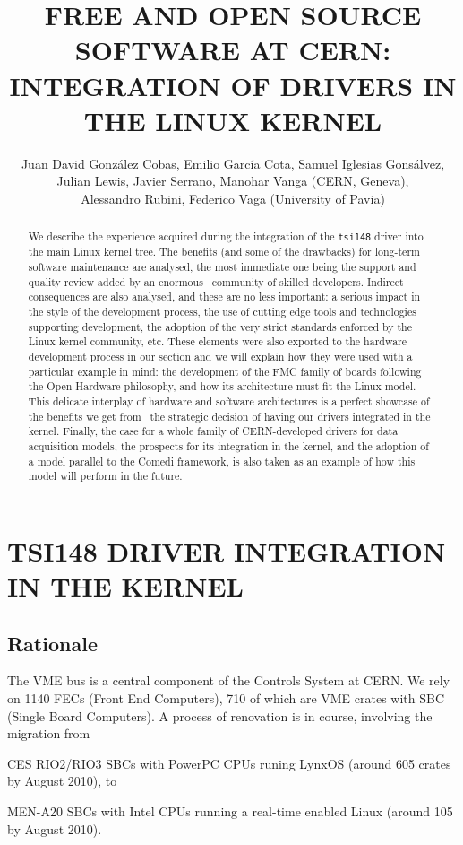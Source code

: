 \documentclass{JAC2003}
\title{%
    FREE AND OPEN SOURCE SOFTWARE AT CERN:\\
    INTEGRATION OF DRIVERS IN THE LINUX KERNEL}
\author{%
	Juan David Gonz\'alez Cobas, Emilio Garc\'ia Cota,
	Samuel Iglesias Gons\'alvez,\\
	Julian Lewis, Javier Serrano, Manohar Vanga (CERN, Geneva),\\ 
	Alessandro Rubini, Federico Vaga (University of Pavia)}
\begin{document}
\maketitle
\begin{abstract}
    We describe the experience acquired during the integration of the
    \texttt{tsi148} driver
    into the main Linux kernel tree. The benefits (and some of the drawbacks) for
    long-term software maintenance are analysed, the most immediate one being the
    support and quality review added by an enormous  community of skilled
    developers. Indirect consequences are also analysed, and these are no less
    important: a serious impact in the style of the development process, the use of
    cutting edge tools and technologies supporting development, the adoption of the
    very strict standards enforced by the Linux kernel community, etc. These
    elements were also exported to the hardware development process in our section
    and we will explain how they were used with a particular example in mind: the
    development of the FMC family of boards following the Open Hardware philosophy,
    and how its architecture must fit the Linux model. This delicate interplay of
    hardware and software architectures is a perfect showcase of the benefits we
    get from  the strategic decision of having our drivers integrated in the
    kernel.  Finally, the case for a whole family of CERN-developed drivers for
    data acquisition models, the prospects for its integration in the kernel, and
    the adoption of a model parallel to the Comedi framework, is also
    taken as an example of how this model will perform in the future.
\end{abstract}


\section{TSI148 DRIVER INTEGRATION IN THE KERNEL}
\subsection{Rationale}
The VME bus is a central component of the Controls System at CERN. We
rely on 1140 FECs (Front End Computers), 710 of which are VME crates
with SBC (Single Board Computers). A process of renovation is in course,
involving the migration from
\begin{Itemize}
\item CES RIO2/RIO3 SBCs with PowerPC CPUs runing LynxOS (around 605
    crates by August 2010), to
\item MEN-A20 SBCs with Intel CPUs running  a real-time enabled Linux
    (around 105 by August 2010).
\end{Itemize}
\end{document}
